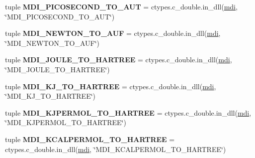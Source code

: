 \begin{DoxyCompactItemize}
\item 
\hypertarget{namespacemolssi__driver__interface_1_1mdi_ace2ba89b94963cf584ce8b1d00ebb59b}{tuple {\bfseries M\-D\-I\-\_\-\-P\-I\-C\-O\-S\-E\-C\-O\-N\-D\-\_\-\-T\-O\-\_\-\-A\-U\-T} = ctypes.\-c\-\_\-double.\-in\-\_\-dll(\hyperlink{classmdi}{mdi}, \char`\"{}M\-D\-I\-\_\-\-P\-I\-C\-O\-S\-E\-C\-O\-N\-D\-\_\-\-T\-O\-\_\-\-A\-U\-T\char`\"{})}\label{namespacemolssi__driver__interface_1_1mdi_ace2ba89b94963cf584ce8b1d00ebb59b}

\item 
\hypertarget{namespacemolssi__driver__interface_1_1mdi_a0898e7e5c47d8dc21ae38b29c10f5827}{tuple {\bfseries M\-D\-I\-\_\-\-N\-E\-W\-T\-O\-N\-\_\-\-T\-O\-\_\-\-A\-U\-F} = ctypes.\-c\-\_\-double.\-in\-\_\-dll(\hyperlink{classmdi}{mdi}, \char`\"{}M\-D\-I\-\_\-\-N\-E\-W\-T\-O\-N\-\_\-\-T\-O\-\_\-\-A\-U\-F\char`\"{})}\label{namespacemolssi__driver__interface_1_1mdi_a0898e7e5c47d8dc21ae38b29c10f5827}

\item 
\hypertarget{namespacemolssi__driver__interface_1_1mdi_a1bae6adb6f6eaaae9ad87cdfa47f337d}{tuple {\bfseries M\-D\-I\-\_\-\-J\-O\-U\-L\-E\-\_\-\-T\-O\-\_\-\-H\-A\-R\-T\-R\-E\-E} = ctypes.\-c\-\_\-double.\-in\-\_\-dll(\hyperlink{classmdi}{mdi}, \char`\"{}M\-D\-I\-\_\-\-J\-O\-U\-L\-E\-\_\-\-T\-O\-\_\-\-H\-A\-R\-T\-R\-E\-E\char`\"{})}\label{namespacemolssi__driver__interface_1_1mdi_a1bae6adb6f6eaaae9ad87cdfa47f337d}

\item 
\hypertarget{namespacemolssi__driver__interface_1_1mdi_a446e20f10967433ccf12ea80f32d41a0}{tuple {\bfseries M\-D\-I\-\_\-\-K\-J\-\_\-\-T\-O\-\_\-\-H\-A\-R\-T\-R\-E\-E} = ctypes.\-c\-\_\-double.\-in\-\_\-dll(\hyperlink{classmdi}{mdi}, \char`\"{}M\-D\-I\-\_\-\-K\-J\-\_\-\-T\-O\-\_\-\-H\-A\-R\-T\-R\-E\-E\char`\"{})}\label{namespacemolssi__driver__interface_1_1mdi_a446e20f10967433ccf12ea80f32d41a0}

\item 
\hypertarget{namespacemolssi__driver__interface_1_1mdi_a3937ae9828af2f61a47a184f84ee095d}{tuple {\bfseries M\-D\-I\-\_\-\-K\-J\-P\-E\-R\-M\-O\-L\-\_\-\-T\-O\-\_\-\-H\-A\-R\-T\-R\-E\-E} = ctypes.\-c\-\_\-double.\-in\-\_\-dll(\hyperlink{classmdi}{mdi}, \char`\"{}M\-D\-I\-\_\-\-K\-J\-P\-E\-R\-M\-O\-L\-\_\-\-T\-O\-\_\-\-H\-A\-R\-T\-R\-E\-E\char`\"{})}\label{namespacemolssi__driver__interface_1_1mdi_a3937ae9828af2f61a47a184f84ee095d}

\item 
\hypertarget{namespacemolssi__driver__interface_1_1mdi_a1179ce5d81a422949e186263ac4cb6c7}{tuple {\bfseries M\-D\-I\-\_\-\-K\-C\-A\-L\-P\-E\-R\-M\-O\-L\-\_\-\-T\-O\-\_\-\-H\-A\-R\-T\-R\-E\-E} = ctypes.\-c\-\_\-double.\-in\-\_\-dll(\hyperlink{classmdi}{mdi}, \char`\"{}M\-D\-I\-\_\-\-K\-C\-A\-L\-P\-E\-R\-M\-O\-L\-\_\-\-T\-O\-\_\-\-H\-A\-R\-T\-R\-E\-E\char`\"{})}\label{namespacemolssi__driver__interface_1_1mdi_a1179ce5d81a422949e186263ac4cb6c7}


\end{DoxyCompactItemize}
